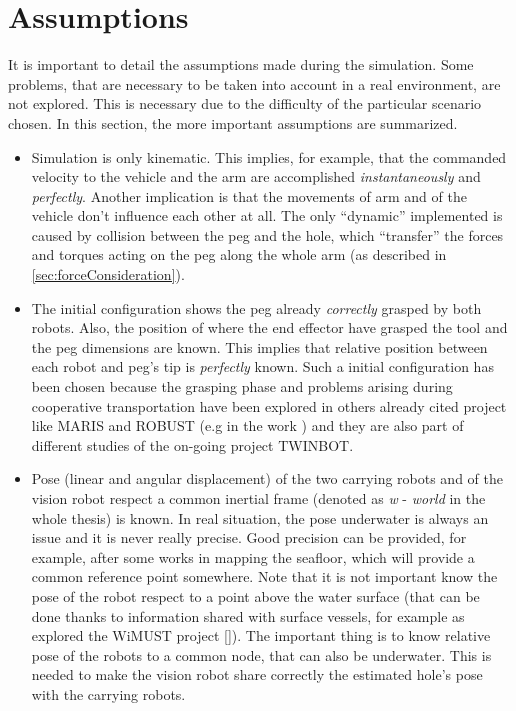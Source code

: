 \section{Assumptions}
It is important to detail the assumptions made during the simulation. Some problems, that are necessary to be taken into account in a real environment, are not explored. This is necessary due to the difficulty of the particular scenario chosen. In this section, the more important assumptions are summarized.

\begin{itemize}
	\item Simulation is only kinematic. This implies, for example, that the commanded velocity to the vehicle and the arm are accomplished \textit{instantaneously} and \textit{perfectly}. Another implication is that the movements of arm and of the vehicle don't influence each other at all. The only \enquote{dynamic} implemented is caused by collision between the peg and the hole, which \enquote{transfer} the forces and torques acting on the peg along the whole arm (as described in \ref{sec:forceConsideration}).
	
	\item The initial configuration shows the peg already \textit{correctly} grasped by both robots. Also, the position of where the end effector have grasped the tool and the peg dimensions are known. This implies that relative position between each robot and peg's tip is \textit{perfectly} known. Such a initial configuration has been chosen because the grasping phase and problems arising during cooperative transportation have been explored in others already cited project like MARIS and ROBUST (e.g in the work \cite{IntroMaris2}) and they are also part of different studies of the on-going project TWINBOT.
	
	
	\item Pose (linear and angular displacement) of the two carrying robots and of the vision robot respect a common inertial frame (denoted as \textit{w} - \textit{world} in the whole thesis) is known. In real situation, the pose underwater is always an issue and it is never really precise. Good precision can be provided, for example, after some works in mapping the seafloor, which will provide a common reference point somewhere. Note that it is not important know the pose of the robot respect to a point above the water surface (that can be done thanks to information shared with surface vessels, for example as explored the WiMUST project [\cite{wimust}]). The important thing is to know relative pose of the robots to a common node, that can also be underwater. This is needed to make the vision robot share correctly the estimated hole's pose with the carrying robots.
	

\end{itemize}

